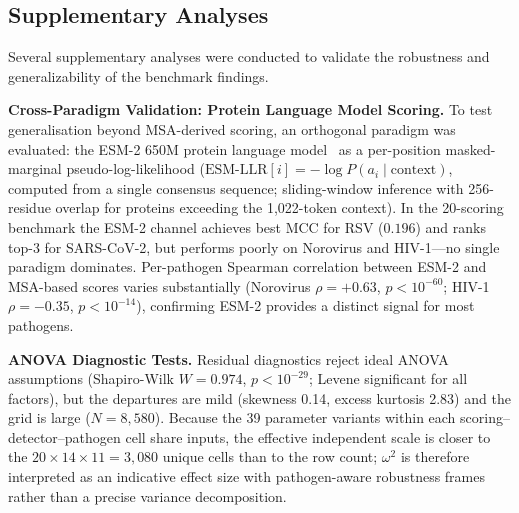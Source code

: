 \subsection{Supplementary Analyses}
\label{subsec:9pathogen_supplementary}

Several supplementary analyses were conducted to validate the robustness and generalizability of the benchmark findings.

\textbf{Cross-Paradigm Validation: Protein Language Model Scoring.}
\label{subsec:esm_validation}
To test generalisation beyond MSA-derived scoring, an orthogonal paradigm was evaluated: the ESM-2 650M protein language model~\cite{lin2023esm2} as a per-position masked-marginal pseudo-log-likelihood ($\text{ESM-LLR}[i] = -\log P(a_i \mid \text{context})$, computed from a single consensus sequence; sliding-window inference with 256-residue overlap for proteins exceeding the 1,022-token context). In the 20-scoring benchmark the ESM-2 channel achieves best MCC for RSV ($0.196$) and ranks top-3 for SARS-CoV-2, but performs poorly on Norovirus and HIV-1---no single paradigm dominates. Per-pathogen Spearman correlation between ESM-2 and MSA-based scores varies substantially (Norovirus $\rho = +0.63$, $p < 10^{-60}$; HIV-1 $\rho = -0.35$, $p < 10^{-14}$), confirming ESM-2 provides a distinct signal for most pathogens.

\textbf{ANOVA Diagnostic Tests.}
\label{subsec:anova_diagnostics}
Residual diagnostics reject ideal ANOVA assumptions (Shapiro-Wilk $W=0.974$, $p<10^{-29}$; Levene significant for all factors), but the departures are mild (skewness 0.14, excess kurtosis 2.83) and the grid is large ($N=8{,}580$). Because the 39 parameter variants within each scoring--detector--pathogen cell share inputs, the effective independent scale is closer to the $20\times14\times11=3{,}080$ unique cells than to the row count; $\omega^2$ is therefore interpreted as an indicative effect size with pathogen-aware robustness frames rather than a precise variance decomposition.


